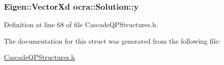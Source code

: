 \subsubsection[{\texorpdfstring{y}{y}}]{\setlength{\rightskip}{0pt plus 5cm}Eigen\+::\+Vector\+Xd ocra\+::\+Solution\+::y}\hypertarget{structocra_1_1Solution_a1b80abc6ec96a3245cf3813c20f417f9}{}\label{structocra_1_1Solution_a1b80abc6ec96a3245cf3813c20f417f9}


Definition at line 68 of file Cascade\+Q\+P\+Structures.\+h.



The documentation for this struct was generated from the following file\+:\begin{DoxyCompactItemize}
\item 
\hyperlink{CascadeQPStructures_8h}{Cascade\+Q\+P\+Structures.\+h}\end{DoxyCompactItemize}
